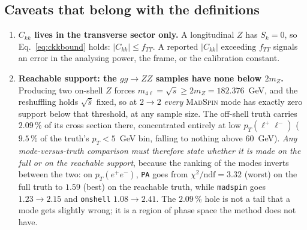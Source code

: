 \documentclass[a4paper,11pt]{article}
\providecommand{\ms}{{\textsc{MadSpin}}}
\providecommand{\code}[1]{\texttt{#1}}
\providecommand{\ckk}{\ensuremath{C_{kk}}}              %
\begin{document}
\subsection{Caveats that belong with the definitions}
\label{subsec:spinobs_caveats}

\begin{enumerate}
\item \textbf{$\ckk$ lives in the transverse sector only.} A longitudinal $Z$
  has $S_k=0$, so Eq.~\eqref{eq:ckkbound} holds: $|\ckk|\le f_{TT}$. A
  reported $|\ckk|$ exceeding $f_{TT}$ signals an error in the analysing power,
  the frame, or the calibration constant.

\item \textbf{Reachable support: the $gg\to ZZ$ samples have none below
  $2m_Z$.} Producing two on-shell $Z$ forces
  $m_{4\ell}=\sqrt{\hat s}\ge2m_Z=182.376$~GeV, and the reshuffling holds
  $\sqrt{\hat s}$ fixed, so at $2\to2$ \emph{every} \ms{} mode has exactly zero
  support below that threshold, at any sample size. The off-shell truth carries
  $2.09\,\%$ of its cross section there, concentrated entirely at low
  $p_T(\ell^+\ell^-)$ ($9.5\,\%$ of the truth's $p_T<5$~GeV bin, falling to
  nothing above $60$~GeV). \emph{Any mode-versus-truth comparison must
  therefore state whether it is made on the full or on the reachable support},
  because the ranking of the modes inverts between the two: on $p_T(e^+e^-)$,
  \code{PA} goes from $\chi^2/\mathrm{ndf}=3.32$ (worst) on the full truth to
  $1.59$ (best) on the reachable truth, while \code{madspin} goes $1.23\to2.15$
  and \code{onshell} $1.08\to2.41$. The $2.09\,\%$ hole is not a tail that a
  mode gets slightly wrong; it is a region of phase space the method does not
  have.
\end{enumerate}

\end{document}
